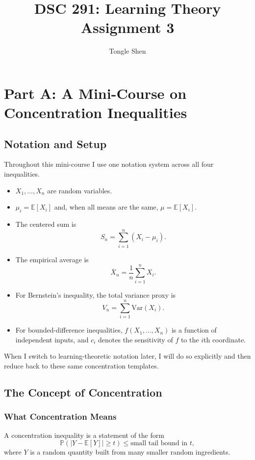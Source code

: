 \documentclass{article}
\title{DSC 291: Learning Theory Assignment 3}
\author{Tongle Shen}
\theoremstyle{definition}
\theoremstyle{remark}
\newcommand{\EE}{\mathbb{E}}
\newcommand{\PP}{\mathbb{P}}
\newcommand{\Var}{\mathrm{Var}}
\begin{document}
\maketitle

\section{Part A: A Mini-Course on Concentration Inequalities}

\subsection{Notation and Setup}

Throughout this mini-course I use one notation system across all four inequalities.

\begin{itemize}
\item $X_1,\dots,X_n$ are random variables.
\item $\mu_i = \EE[X_i]$ and, when all means are the same, $\mu = \EE[X_i]$.
\item The centered sum is
$$
S_n = \sum_{i=1}^n (X_i - \mu_i).
$$
\item The empirical average is
$$
\overline{X}_n = \frac{1}{n} \sum_{i=1}^n X_i.
$$
\item For Bernstein's inequality, the total variance proxy is
$$
V_n = \sum_{i=1}^n \Var(X_i).
$$
\item For bounded-difference inequalities, $f(X_1,\dots,X_n)$ is a function of independent inputs, and $c_i$ denotes the sensitivity of $f$ to the $i$th coordinate.
\end{itemize}

When I switch to learning-theoretic notation later, I will do so explicitly and then reduce back to these same concentration templates.

\subsection{The Concept of Concentration}

\subsubsection{What Concentration Means}

A concentration inequality is a statement of the form
$$
\PP(|Y - \EE[Y]| \ge t) \le \text{small tail bound in } t,
$$
where $Y$ is a random quantity built from many smaller random ingredients.
\end{document}
